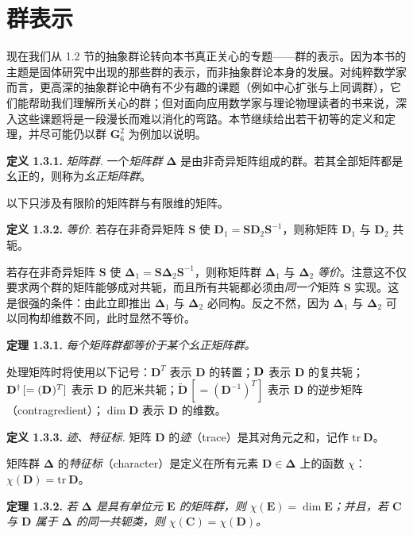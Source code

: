 \section{群表示}

现在我们从 1.2 节的抽象群论转向本书真正关心的专题——群的表示。因为本书的主题是固体研究中出现的那些群的表示，而非抽象群论本身的发展。对纯粹数学家而言，更高深的抽象群论中确有不少有趣的课题（例如中心扩张与上同调群），它们能帮助我们理解所关心的群；但对面向应用数学家与理论物理读者的书来说，深入这些课题将是一段漫长而难以消化的弯路。本节继续给出若干初等的定义和定理，并尽可能仍以群 $\mathbf{G}_6^2$ 为例加以说明。

\textbf{定义 1.3.1.} \textit{矩阵群.} 一个\textit{矩阵群} $\boldsymbol{\Delta}$ 是由非奇异矩阵组成的群。若其全部矩阵都是幺正的，则称为\textit{幺正矩阵群}。

以下只涉及有限阶的矩阵群与有限维的矩阵。

\textbf{定义 1.3.2.} \textit{等价.} 若存在非奇异矩阵 $\mathbf{S}$ 使 $\mathbf{D}_{1} = \mathbf{S}\mathbf{D}_{2}\mathbf{S}^{-1}$，则称矩阵 $\mathbf{D}_{1}$ 与 $\mathbf{D}_{2}$ 共轭。

若存在非奇异矩阵 $\mathbf{S}$ 使 $\boldsymbol{\Delta}_{1} = \mathbf{S}\boldsymbol{\Delta}_{2}\mathbf{S}^{-1}$，则称矩阵群 $\boldsymbol{\Delta}_{1}$ 与 $\boldsymbol{\Delta}_{2}$ \textit{等价}。注意这不仅要求两个群的矩阵能够成对共轭，而且所有共轭都必须由\textit{同一个}矩阵 $\mathbf{S}$ 实现。这是很强的条件：由此立即推出 $\boldsymbol{\Delta}_{1}$ 与 $\boldsymbol{\Delta}_{2}$ 必同构。反之不然，因为 $\boldsymbol{\Delta}_{1}$ 与 $\boldsymbol{\Delta}_{2}$ 可以同构却维数不同，此时显然不等价。

\textbf{定理 1.3.1.} \textit{每个矩阵群都等价于某个幺正矩阵群。}

处理矩阵时将使用以下记号：$\mathbf{D}^{T}$ 表示 $\mathbf{D}$ 的转置；$\mathbf{D}^{\*}$ 表示 $\mathbf{D}$ 的复共轭；$\mathbf{D}^{\dagger}\,[=(\mathbf{D}^{\*})^{T}]$ 表示 $\mathbf{D}$ 的厄米共轭；$\tilde{\mathbf{D}}\,[=(\mathbf{D}^{-1})^{T}]$ 表示 $\mathbf{D}$ 的逆步矩阵（contragredient）；$\dim \mathbf{D}$ 表示 $\mathbf{D}$ 的维数。

\textbf{定义 1.3.3.} \textit{迹、特征标.} 矩阵 $\mathbf{D}$ 的\textit{迹}（trace）是其对角元之和，记作 $\mathrm{tr}\ \mathbf{D}$。

矩阵群 $\boldsymbol{\Delta}$ 的\textit{特征标}（character）是定义在所有元素 $\mathbf{D} \in \boldsymbol{\Delta}$ 上的函数 $\chi$：$\chi(\mathbf{D}) = \mathrm{tr}\ \mathbf{D}$。

\textbf{定理 1.3.2.} \textit{若 $\boldsymbol{\Delta}$ 是具有单位元 $\mathbf{E}$ 的矩阵群，则 $\chi(\mathbf{E}) = \dim \mathbf{E}$；并且，若 $\mathbf{C}$ 与 $\mathbf{D}$ 属于 $\boldsymbol{\Delta}$ 的同一共轭类，则 $\chi(\mathbf{C}) = \chi(\mathbf{D})$。}

